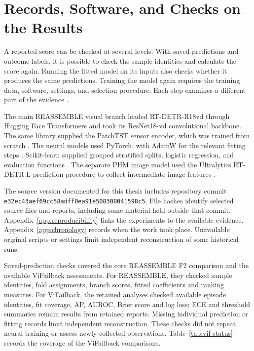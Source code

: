 \section{Records, Software, and Checks on the Results}
\label{sec:ch4-reproducibility}

A reported score can be checked at several levels. With saved predictions and outcome
labels, it is possible to check the sample identities and calculate the score again.
Running the fitted model on its inputs also checks whether it produces the same
predictions. Training the model again requires the training data, software, settings,
and selection procedure. Each step examines a different part of the evidence
\parencite{P009}.

The main REASSEMBLE visual branch loaded RT-DETR-R18vd through Hugging Face Transformers
and took its ResNet18-vd convolutional backbone. The same library supplied the PatchTST
sensor encoder, which was trained from scratch \parencite{Wolf2020Transformers}. The
neural models used PyTorch, with AdamW for the relevant fitting steps
\parencite{Paszke2019PyTorch}. Scikit-learn supplied grouped stratified splits, logistic
regression, and evaluation functions \parencite{Pedregosa2011ScikitLearn}. The separate
PHM image model used the Ultralytics RT-DETR-L prediction procedure to collect
intermediate image features \parencite{UltralyticsRTDETR}.

The source version documented for this thesis includes repository commit
\texttt{e32ec43aef69cc58adff0ea91e508308041598c5}. File hashes identify selected source
files and reports, including some material held outside that commit.
Appendix~\ref{app:reproducibility} links the experiments to the available evidence.
Appendix~\ref{app:chronology} records when the work took place. Unavailable original scripts or settings limit independent reconstruction of some
historical runs.

Saved-prediction checks covered the core REASSEMBLE F2 comparison and the available
ViFailback assessments. For REASSEMBLE, they checked sample identities, fold assignments,
branch scores, fitted coefficients and ranking measures. For ViFailback, the retained
analyses checked available episode identities, fit coverage, AP, AUROC, Brier score and
log loss; ECE and threshold summaries remain results from retained reports. Missing
individual prediction or fitting records limit independent reconstruction. These checks
did not repeat neural training or assess newly collected observations.
Table~\ref{tab:vif-status} records the coverage of the ViFailback comparisons.

